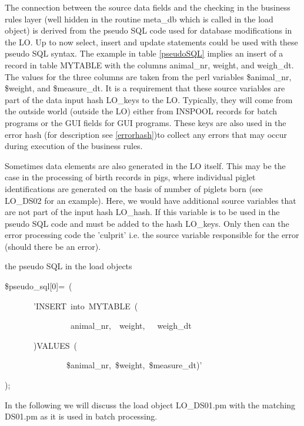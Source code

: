 The connection between the source data fields and the checking in
the business rules layer (well hidden in the routine meta\_db which
is called in the load object) is derived from the pseudo SQL code
used for database modifications in the LO. Up to now select, insert
and update statements could be used with these pseudo SQL syntax.
The example in table \ref{pseudoSQL} implies an insert of a record
in table MYTABLE with the columns animal\_nr, weight, and weigh\_dt.
The values for the three columns are taken from the perl variables
\$animal\_nr, \$weight, and \$measure\_dt. It is a requirement that
these source variables are part of the data input hash LO\_keys to
the LO. Typically, they will come from the outside world (outside
the LO) either from INSPOOL records for batch programs or the GUI
fields for GUI programs. These keys are also used in the error hash
(for description see \ref{errorhash})to collect any errors that may
occur during execution of the business rules.

Sometimes data elements are also generated in the LO itself. This
may be the case in the processing of birth records in pigs, where
individual piglet identifications are generated on the basis of number
of piglets born (see LO\_DS02 for an example). Here, we would have
additional source variables that are not part of the input hash LO\_hash.
If this variable is to be used in the pseudo SQL code and must be
added to the hash LO\_keys. Only then can the error processing code
the 'culprit' i.e. the source variable responsible for the error (should
there be an error).

%
\begin{table}[htbp]

\caption{\label{pseudoSQL}the pseudo SQL in the load objects}

\begin{lyxcode}
\$pseudo\_sql{[}0{]}=~(

~~~~~~~'INSERT~into~MYTABLE~(

~~~~~~~~~~~~~~~~animal\_nr,~~weight,~~~weigh\_dt

~~~~~~~)VALUES~(

~~~~~~~~~~~~~~~\$animal\_nr,~\$weight,~\$measure\_dt)'

);\end{lyxcode}

\end{table}


In the following we will discuss the load object LO\_DS01.pm
with the matching DS01.pm as it is used
in batch processing.


